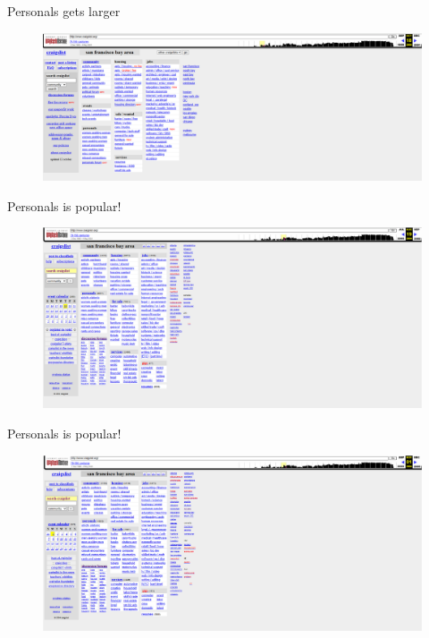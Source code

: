 \documentclass{beamer}
\begin{document}
\begin{frame}{Personals gets larger}
\begin{figure}
    \centering
    \includegraphics[height=0.85\textheight]{./lecture_includes/melanie5}
\end{figure}

\end{frame}

\begin{frame}{Personals is popular!}
\begin{figure}
    \centering
    \includegraphics[height=0.85\textheight]{./lecture_includes/melanie6}
\end{figure}

\end{frame}

\begin{frame}{Personals is popular!}
\begin{figure}
    \centering
    \includegraphics[height=0.85\textheight]{./lecture_includes/melanie7}
\end{figure}

\end{frame}
\end{document}
